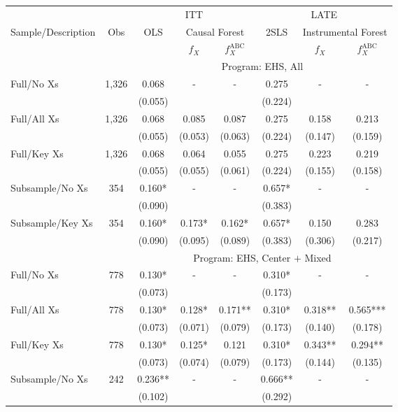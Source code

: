 \begin{tabular}{lccccccc}
\toprule 
\midrule 
\multicolumn{2}{c}{} & \multicolumn{3}{c}{ITT} & \multicolumn{3}{c}{LATE} \\
 \cmidrule(lr){3-5} \cmidrule(lr){6-8} 
Sample/Description & Obs & OLS & \multicolumn{2}{c}{Causal Forest} & 2SLS & \multicolumn{2}{c}{Instrumental Forest} \\
\multicolumn{3}{c}{} & $f_X$ & $f_X^{\text{ABC}}$ &  & $f_X$ & $f_X^{\text{ABC}}$ \\
\midrule 
 &  & \multicolumn{6}{c}{Program: EHS, All} \\
 \cmidrule(lr){3-8} 
Full/No Xs & 1,326 & 0.068 & - & - & 0.275 & - & - \\
 &  & (0.055) &  &  & (0.224) &  &  \\
Full/All Xs & 1,326 & 0.068 & 0.085 & 0.087 & 0.275 & 0.158 & 0.213 \\
 &  & (0.055) & (0.053) & (0.063) & (0.224) & (0.147) & (0.159) \\
Full/Key Xs & 1,326 & 0.068 & 0.064 & 0.055 & 0.275 & 0.223 & 0.219 \\
 &  & (0.055) & (0.055) & (0.061) & (0.224) & (0.155) & (0.158) \\
Subsample/No Xs & 354 & 0.160* & - & - & 0.657* & - & - \\
 &  & (0.090) &  &  & (0.383) &  &  \\
Subsample/Key Xs & 354 & 0.160* & 0.173* & 0.162* & 0.657* & 0.150 & 0.283 \\
 &  & (0.090) & (0.095) & (0.089) & (0.383) & (0.306) & (0.217) \\
\midrule 
 &  & \multicolumn{6}{c}{Program: EHS, Center $+$ Mixed} \\
 \cmidrule(lr){3-8} 
Full/No Xs & 778 & 0.130* & - & - & 0.310* & - & - \\
 &  & (0.073) &  &  & (0.173) &  &  \\
Full/All Xs & 778 & 0.130* & 0.128* & 0.171** & 0.310* & 0.318** & 0.565*** \\
 &  & (0.073) & (0.071) & (0.079) & (0.173) & (0.140) & (0.178) \\
Full/Key Xs & 778 & 0.130* & 0.125* & 0.121 & 0.310* & 0.343** & 0.294** \\
 &  & (0.073) & (0.074) & (0.079) & (0.173) & (0.144) & (0.135) \\
Subsample/No Xs & 242 & 0.236** & - & - & 0.666** & - & - \\
 &  & (0.102) &  &  & (0.292) &  &  \\

\end{tabular}
